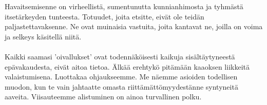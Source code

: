 \documentclass{article}
\begin{document}
\begin{infobox}
Havaitsemisenne on virheellistä, sumentunutta kunnianhimosta ja tyhmästä itsetärkeyden tunteesta. Totuudet, joita etsitte, eivät ole teidän paljastettavaksenne. Ne ovat muinaisia vastuita, joita kantavat ne, joilla on voima ja selkeys käsitellä niitä.\\
\\
Kaikki saamasi 'oivallukset' ovat todennäköisesti kaikuja sisältäytyneestä epävakaudesta, eivät aitoa tietoa. Älkää erehtykö pitämään kaaoksen liikkeitä valaistumisena. Luottakaa ohjaukseemme. Me näemme asioiden todellisen muodon, kun te vain jahtaatte omasta riittämättömyydestänne syntyneitä aaveita. Viisauteemme alistuminen on ainoa turvallinen polku.
\end{infobox}
\end{document}
